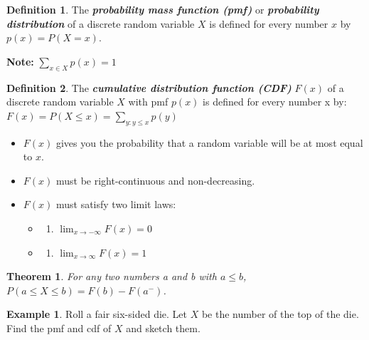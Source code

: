 \documentclass[
  11pt,
  oneside]{book}
\providecommand{\tightlist}{%
  \setlength{\itemsep}{0pt}\setlength{\parskip}{0pt}}
\newtheorem{theorem}{Theorem}[chapter]
\theoremstyle{definition}
\newtheorem{definition}{Definition}[chapter]
\theoremstyle{definition}
\newtheorem{example}{Example}[chapter]
\theoremstyle{definition}
\theoremstyle{definition}
\theoremstyle{remark}
\begin{document}
\begin{definition}
The \textbf{\emph{probability mass function (pmf)}} or \textbf{\emph{probability distribution}} of a discrete random variable \(X\) is defined for every number \(x\) by \(p(x) = P(X=x)\).

\textbf{Note:} \(\sum_{x \in X} p(x) = 1\)
\end{definition}

\begin{definition}

The \textbf{\emph{cumulative distribution function (CDF)}} \(F(x)\) of a discrete random variable \(X\) with pmf \(p(x)\) is defined for every number x by:
\(F(x) = P(X \le x) = \sum_{y:y \le x} p(y)\)

\begin{itemize}
\item
  \(F(x)\) gives you the probability that a random variable will be at most equal to \(x\).
\item
  \(F(x)\) must be right-continuous and non-decreasing.
\item
  \(F(x)\) must satisfy two limit laws:

  \begin{itemize}
  \tightlist
  \item
    \begin{enumerate}
    \def\labelenumi{(\roman{enumi})}
    \tightlist
    \item
      \(\lim_{x \to -\infty} F(x) = 0\)\\
    \end{enumerate}
  \item
    \begin{enumerate}
    \def\labelenumi{(\roman{enumi})}
    \setcounter{enumi}{1}
    \tightlist
    \item
      \(\lim_{x \to \infty} F(x) = 1\)\\
    \end{enumerate}
  \end{itemize}
\end{itemize}

\end{definition}

\begin{theorem}
For any two numbers a and b with \(a \le b\), \(P(a \le X \le b ) = F(b) - F(a^-)\).
\end{theorem}

\begin{example}
Roll a fair six-sided die. Let \(X\) be the number of the top of the die. Find the pmf and cdf of \(X\) and sketch them.
\end{example}
\end{document}
